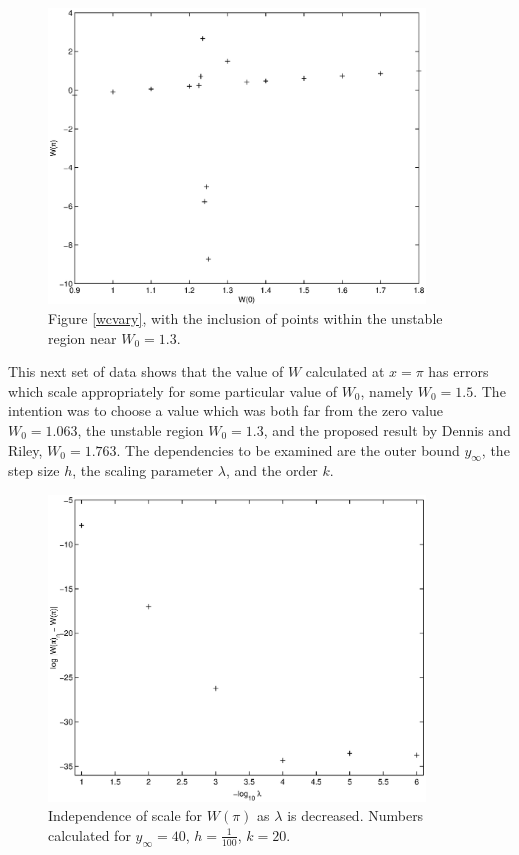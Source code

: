 \documentclass[10pt,a4paper]{report}
\begin{document}
\begin{figure}[p]
\centering
\includegraphics[width=10cm]{pics/wcpi_bad.eps}
\caption[Plot of $W(\pi)$ versus $W_0$, including unstable region]{Figure \ref{wcvary}, with the inclusion of points within the unstable region near $W_0 = 1.3$.}
\label{wcvarybad}
\end{figure}

\clearpage

This next set of data shows that the value of $W$ calculated at $x=\pi$ has errors which scale appropriately for some particular value of $W_0$, namely $W_0 = 1.5$. The intention was to choose a value which was both far from the zero value $W_0 = 1.063$, the unstable region $W_0 = 1.3$, and the proposed result by Dennis and Riley, $W_0 = 1.763$. The dependencies to be examined are the outer bound $y_\infty$, the step size $h$, the scaling parameter $\lambda$, and the order $k$.

\begin{figure}[h]
\centering
\includegraphics[width=10cm]{pics/wcpi_scale.eps}
\caption[Independence of scale for $W(\pi)$]{Independence of scale for $W(\pi)$ as $\lambda$ is decreased. Numbers calculated for $y_\infty=40$, $h = \frac{1}{100}$, $k=20$.}
\label{wcscale}
\end{figure}
\end{document}
